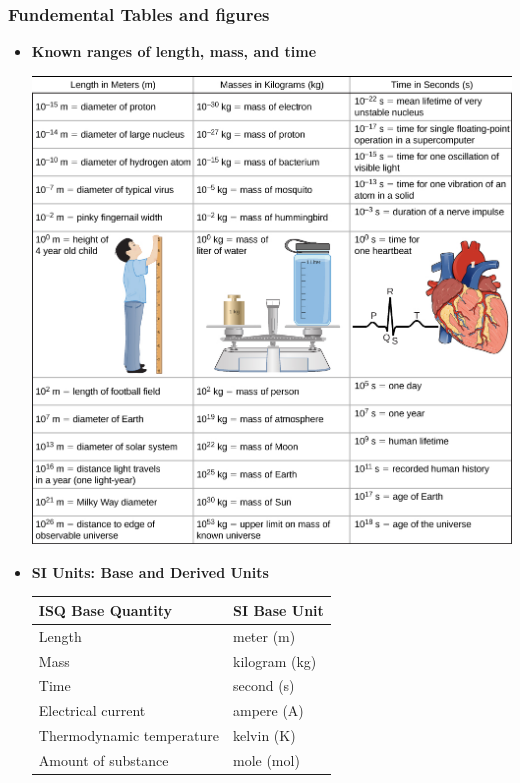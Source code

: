 \documentclass{report}
\begin{document}
    \subsubsection{Fundemental Tables and figures}
    \begin{itemize}
        \item \textbf{Known ranges of length, mass, and time}
            \begin{center}
                \includegraphics[scale=.7]{./figures/physfig1.jpeg  }
            \end{center}
        \item \textbf{SI Units: Base and Derived Units}
            \bigbreak \noindent 
            \begin{tabularx}{\textwidth}{|X|X|}
                \hline
                ISQ Base Quantity & SI Base Unit \\
                \hline
                Length & meter (m) \\
                Mass & kilogram (kg) \\
                Time & second (s) \\
                Electrical current & ampere (A) \\
                Thermodynamic temperature & kelvin (K) \\
                Amount of substance & mole (mol) \\

\end{tabularx}
\end{itemize}
\end{document}
